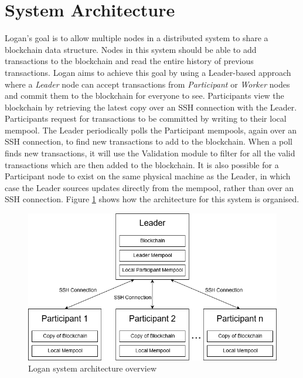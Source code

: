 \documentclass[12pt,a4paper,twoside,openright]{report}
\begin{document}
	\section{System Architecture}\label{sec:sysarch}
	Logan's goal is to allow multiple nodes in a distributed system to share a blockchain data structure.
	Nodes in this system should be able to add transactions to the blockchain and read the entire history of previous transactions.
	Logan aims to achieve this goal by using a Leader-based approach where a \textit{Leader} node can accept transactions from \textit{Participant} or \textit{Worker} nodes and commit them to the blockchain for everyone to see.
	Participants view the blockchain by retrieving the latest copy over an SSH connection with the Leader.
	Participants request for transactions to be committed by writing to their local mempool. 
	The Leader periodically polls the Participant mempools, again over an SSH connection, to find new transactions to add to the blockchain.
	When a poll finds new transactions, it will use the Validation module to filter for all the valid transactions which are then added to the blockchain.
	It is also possible for a Participant node to exist on the same physical machine as the Leader, in which case the Leader sources updates directly from the mempool, rather than over an SSH connection. 
	Figure \ref{fig:sysarch} shows how the architecture for this system is organised.\\	

	\begin{figure}
		\centering
		\includegraphics[width=16cm]{figs/System_Architecture.png}
		\caption{Logan system architecture overview}
		\label{fig:sysarch}
	\end{figure}
\end{document}
